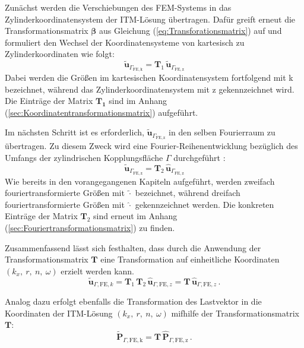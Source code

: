 Zunächst werden die Verschiebungen des FEM-Systems in das Zylinderkoordinatensystem der ITM-Lösung übertragen.
Dafür greift \cite{Fruehe2010} erneut die Transformationsmatrix $\bm{\beta}$ aus Gleichung (\ref{eq:Transforationsmatrix}) auf und formuliert den Wechsel der Koordinatensysteme von kartesisch zu Zylinderkoordinaten wie folgt:
\begin{equation}\label{eq:u_FE_Zylinder}
	\tilde{\mathbf u}_{\Gamma_{\mathrm{FE,k}}}
	= \mathbf T_{1}\,
	\tilde{\mathbf u}_{\Gamma_{\mathrm{FE,z}}}
\end{equation}
Dabei werden die Größen im kartesischen Koordinatensystem fortfolgend mit k bezeichnet, während das Zylinderkoordinatensystem mit z gekennzeichnet wird.
Die Einträge der Matrix $\mathbf{T_1}$ sind im Anhang (\ref{sec:Koordinatentransformationsmatrix}) aufgeführt.

Im nächsten Schritt ist es erforderlich, $\tilde{\mathbf u}_{\Gamma_{\mathrm{FE,z}}}$ in den selben Fourierraum zu übertragen. Zu diesem Zweck wird eine Fourier-Reihenentwicklung bezüglich des Umfangs der zylindrischen Kopplungsfläche $\Gamma$ durchgeführt \citep{Hackenberg2016}:
\begin{equation}\label{eq:u_FE_Fourier}
	\tilde{\mathbf u}_{\Gamma_{\mathrm{FE,z}}}
	= \mathbf T_{2}\,
	\hat{\mathbf u}_{\Gamma_{\mathrm{FE,z}}}
\end{equation}
Wie bereits in den vorangegangenen Kapiteln aufgeführt, werden zweifach fouriertransformierte Größen mit \(\tilde{\cdot}\) bezeichnet,
während dreifach fouriertransformierte Größen mit \(\widehat{\cdot}\) gekennzeichnet werden.
Die konkreten Einträge der Matrix \(\mathbf T_{2}\) sind erneut im Anhang (\ref{sec:Fouriertransformationsmatrix}) zu finden.

Zusammenfassend lässt sich festhalten, dass durch die Anwendung der Transformationsmatrix \(\mathbf T\) eine Transformation auf einheitliche Koordinaten \\$(k_x,\ r,\ n,\ \omega)$ erzielt werden kann.
\begin{equation}\label{eq:tilde_u_FE}
	\tilde{\mathbf u}_{\Gamma,\mathrm{FE},k}
	= \mathbf T_{1}\,\mathbf T_{2}\,\hat{\mathbf u}_{\Gamma,\mathrm{FE},z}
	= \mathbf T\,\hat{\mathbf u}_{\Gamma,\mathrm{FE},z}\,.
\end{equation}

Analog dazu erfolgt ebenfalls die Transformation des Lastvektor in die Koordinaten der ITM-Lösung $(k_x,\ r,\ n,\ \omega)$ mifhilfe der Transformationsmatrix \(\mathbf T\):
\begin{equation}\label{eq:tildeP_FE}
	\tilde{\mathbf P}_{\Gamma,\mathrm{FE,k}}
	= \mathbf T\,
	\hat{\mathbf P}_{\Gamma,\mathrm{FE,z}} \,.
\end{equation}



